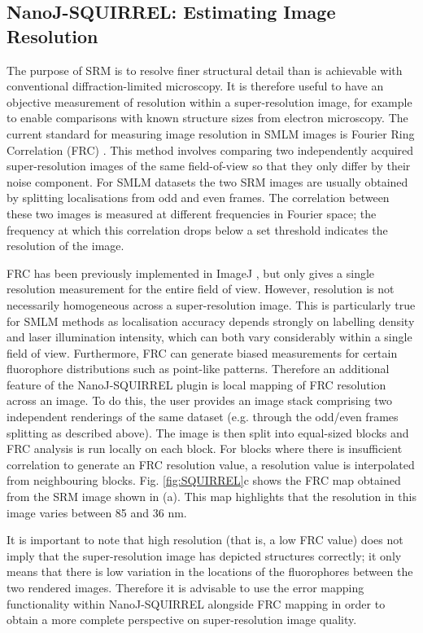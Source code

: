 \subsection*{NanoJ-SQUIRREL: Estimating Image Resolution}
The purpose of SRM is to resolve finer structural detail than is achievable with conventional diffraction-limited microscopy. It is therefore useful to have an objective measurement of resolution within a super-resolution image, for example to enable comparisons with known structure sizes from electron microscopy. The current standard for measuring image resolution in SMLM images is Fourier Ring Correlation (FRC) \cite{nieuwenhuizen2013measuring}. This method involves comparing two independently acquired super-resolution images of the same field-of-view so that they only differ by their noise component. For SMLM datasets the two SRM images are usually obtained by splitting localisations from odd and even frames. The correlation between these two images is measured at different frequencies in Fourier space; the frequency at which this correlation drops below a set threshold indicates the resolution of the image.

 FRC has been previously implemented in ImageJ \cite{nieuwenhuizen2013measuring}, but only gives a single resolution measurement for the entire field of view. However, resolution is not necessarily homogeneous across a super-resolution image. This is particularly true for SMLM methods as localisation accuracy depends strongly on labelling density and laser illumination intensity, which can both vary considerably within a single field of view. Furthermore, FRC can generate biased measurements for certain fluorophore distributions such as point-like patterns. Therefore an additional feature of the NanoJ-SQUIRREL plugin is local mapping of FRC resolution across an image. To do this, the user provides an image stack comprising two independent renderings of the same dataset (e.g. through the odd/even frames splitting as described above). The image is then split into equal-sized blocks and FRC analysis is run locally on each block. For blocks where there is insufficient correlation to generate an FRC resolution value, a resolution value is interpolated from neighbouring blocks. Fig. \ref{fig:SQUIRREL}c shows the FRC map obtained from the SRM image shown in (a). This map highlights that the resolution in this image varies between 85 and 36 nm.

It is important to note that high resolution (that is, a low FRC value) does not imply that the super-resolution image has depicted structures correctly; it only means that there is low variation in the locations of the fluorophores between the two rendered images. Therefore it is advisable to use the error mapping functionality within NanoJ-SQUIRREL alongside FRC mapping in order to obtain a more complete perspective on super-resolution image quality.

